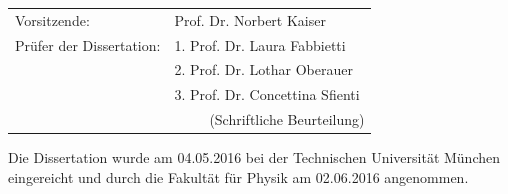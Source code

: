 {  	\begin{tabularx}{1.0\textwidth}{XX}
	Vorsitzende:	&	Prof. Dr. Norbert Kaiser \\
	Prüfer der Dissertation:	&	1. Prof. Dr. Laura Fabbietti \\
							&	2. Prof. Dr. Lothar Oberauer \\
							&	3. Prof. Dr. Concettina Sfienti  \\
							& \ \ \ \ \  (Schriftliche Beurteilung) \\
	\end{tabularx}


	\vspace*{\fill}

	Die Dissertation wurde am 04.05.2016 bei der Technischen Universität München
	eingereicht und durch die Fakultät für Physik am 02.06.2016 angenommen.

  \vspace*{\fill}

  \null
  \vfill

}


